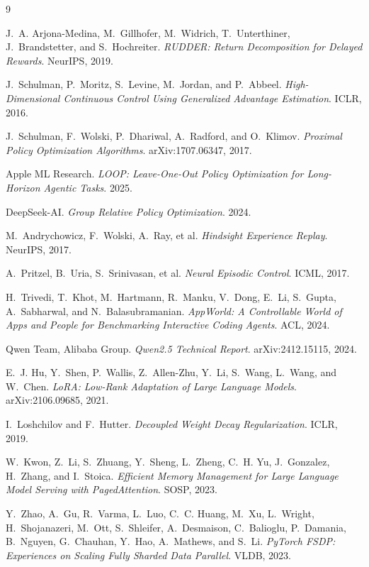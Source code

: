 \documentclass[11pt]{article}
\begin{document}
\begin{thebibliography}{9}

J.~A. Arjona-Medina, M.~Gillhofer, M.~Widrich, T.~Unterthiner, J.~Brandstetter,
and S.~Hochreiter.
\textit{RUDDER: Return Decomposition for Delayed Rewards}.
NeurIPS, 2019.

J.~Schulman, P.~Moritz, S.~Levine, M.~Jordan, and P.~Abbeel.
\textit{High-Dimensional Continuous Control Using Generalized Advantage Estimation}.
ICLR, 2016.

J.~Schulman, F.~Wolski, P.~Dhariwal, A.~Radford, and O.~Klimov.
\textit{Proximal Policy Optimization Algorithms}.
arXiv:1707.06347, 2017.

Apple ML Research.
\textit{LOOP: Leave-One-Out Policy Optimization for Long-Horizon Agentic Tasks}.
2025.

DeepSeek-AI.
\textit{Group Relative Policy Optimization}.
2024.

M.~Andrychowicz, F.~Wolski, A.~Ray, et al.
\textit{Hindsight Experience Replay}.
NeurIPS, 2017.

A.~Pritzel, B.~Uria, S.~Srinivasan, et al.
\textit{Neural Episodic Control}.
ICML, 2017.

H.~Trivedi, T.~Khot, M.~Hartmann, R.~Manku, V.~Dong, E.~Li, S.~Gupta,
A.~Sabharwal, and N.~Balasubramanian.
\textit{AppWorld: A Controllable World of Apps and People for Benchmarking
Interactive Coding Agents}.
ACL, 2024.

Qwen Team, Alibaba Group.
\textit{Qwen2.5 Technical Report}.
arXiv:2412.15115, 2024.

E.~J. Hu, Y.~Shen, P.~Wallis, Z.~Allen-Zhu, Y.~Li, S.~Wang, L.~Wang, and
W.~Chen.
\textit{LoRA: Low-Rank Adaptation of Large Language Models}.
arXiv:2106.09685, 2021.

I.~Loshchilov and F.~Hutter.
\textit{Decoupled Weight Decay Regularization}.
ICLR, 2019.

W.~Kwon, Z.~Li, S.~Zhuang, Y.~Sheng, L.~Zheng, C.~H. Yu, J.~Gonzalez, H.~Zhang,
and I.~Stoica.
\textit{Efficient Memory Management for Large Language Model Serving with
PagedAttention}.
SOSP, 2023.

Y.~Zhao, A.~Gu, R.~Varma, L.~Luo, C.~C. Huang, M.~Xu, L.~Wright, H.~Shojanazeri,
M.~Ott, S.~Shleifer, A.~Desmaison, C.~Balioglu, P.~Damania, B.~Nguyen,
G.~Chauhan, Y.~Hao, A.~Mathews, and S.~Li.
\textit{PyTorch FSDP: Experiences on Scaling Fully Sharded Data Parallel}.
VLDB, 2023.

\end{thebibliography}
\end{document}

